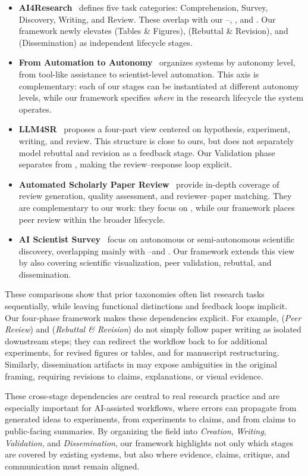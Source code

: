 \begin{itemize}[leftmargin=*]
  \item \textbf{AI4Research}~\cite{ai4research2025} defines five task categories: Comprehension, Survey, Discovery, Writing, and Review. These overlap with our \Sone--\Sthree, \Sfive, and \Ssix. Our framework newly elevates \Sfour (Tables \& Figures), \Sseven (Rebuttal \& Revision), and \Seight (Dissemination) as independent lifecycle stages.

  \item \textbf{From Automation to Autonomy}~\cite{zheng2025automation} organizes systems by autonomy level, from tool-like assistance to scientist-level automation. This axis is complementary: each of our stages can be instantiated at different autonomy levels, while our framework specifies \emph{where} in the research lifecycle the system operates.

  \item \textbf{LLM4SR}~\cite{luo2025llm4sr} proposes a four-part view centered on hypothesis, experiment, writing, and review. This structure is close to ours, but does not separately model rebuttal and revision as a feedback stage. Our Validation phase separates \Ssix from \Sseven, making the review--response loop explicit.

  \item \textbf{Automated Scholarly Paper Review}~\cite{zhuang2025asprsurvey} provide in-depth coverage of review generation, quality assessment, and reviewer--paper matching. They are complementary to our work: they focus on \Ssix, while our framework places peer review within the broader lifecycle.

  \item \textbf{AI Scientist Survey}~\cite{tie2025survey} focus on autonomous or semi-autonomous scientific discovery, overlapping mainly with \Sone--\Sthree and \Sfive. Our framework extends this view by also covering scientific visualization, peer validation, rebuttal, and dissemination.
\end{itemize}

These comparisons show that prior taxonomies often list research tasks sequentially, while leaving functional distinctions and feedback loops implicit. Our four-phase framework makes these dependencies explicit. For example, \Ssix (\emph{Peer Review}) and \Sseven (\emph{Rebuttal \& Revision}) do not simply follow paper writing as isolated downstream steps; they can redirect the workflow back to \Sthree for additional experiments, \Sfour for revised figures or tables, and \Sfive for manuscript restructuring. Similarly, dissemination artifacts in \Seight may expose ambiguities in the original framing, requiring revisions to claims, explanations, or visual evidence. 

These cross-stage dependencies are central to real research practice and are especially important for AI-assisted workflows, where errors can propagate from generated ideas to experiments, from experiments to claims, and from claims to public-facing summaries. By organizing the field into \emph{Creation}, \emph{Writing}, \emph{Validation}, and \emph{Dissemination}, our framework highlights not only which stages are covered by existing systems, but also where evidence, claims, critique, and communication must remain aligned.